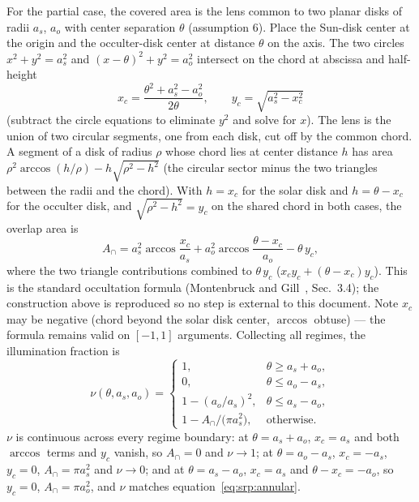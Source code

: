 For the partial case, the covered area is the lens common to two planar
disks of radii $a_{s}$, $a_{o}$ with center separation $\theta$
(assumption 6). Place the Sun-disk center at the origin and the
occulter-disk center at distance $\theta$ on the axis. The two circles
$x^{2} + y^{2} = a_{s}^{2}$ and $(x - \theta)^{2} + y^{2} = a_{o}^{2}$
intersect on the chord at abscissa and half-height
\begin{equation}
  x_{c} = \frac{\theta^{2} + a_{s}^{2} - a_{o}^{2}}{2\theta},
  \qquad
  y_{c} = \sqrt{a_{s}^{2} - x_{c}^{2}}
  \label{eq:srp:chord}
\end{equation}
(subtract the circle equations to eliminate $y^{2}$ and solve for $x$).
The lens is the union of two circular segments, one from each disk, cut
off by the common chord. A segment of a disk of radius $\rho$ whose
chord lies at center distance $h$ has area $\rho^{2} \arccos(h/\rho) -
h \sqrt{\rho^{2} - h^{2}}$ (the circular sector minus the two triangles
between the radii and the chord). With $h = x_{c}$ for the solar disk
and $h = \theta - x_{c}$ for the occulter disk, and
$\sqrt{\rho^{2} - h^{2}} = y_{c}$ on the shared chord in both cases, the
overlap area is
\begin{equation}
  A_{\cap} = a_{s}^{2} \arccos \frac{x_{c}}{a_{s}}
           + a_{o}^{2} \arccos \frac{\theta - x_{c}}{a_{o}}
           - \theta\, y_{c},
  \label{eq:srp:overlap}
\end{equation}
where the two triangle contributions combined to $\theta\, y_{c}$
($x_{c} y_{c} + (\theta - x_{c}) y_{c}$). This is the standard
occultation formula (Montenbruck and Gill~\cite{montenbruck2000},
Sec.~3.4); the construction above is reproduced so no step is external
to this document. Note $x_{c}$ may be negative (chord beyond the solar
disk center, $\arccos$ obtuse) --- the formula remains valid on
$[-1, 1]$ arguments. Collecting all regimes, the illumination fraction
is
\begin{equation}
  \boxed{\;
  \nu(\theta, a_{s}, a_{o}) =
  \begin{cases}
    1, & \theta \geq a_{s} + a_{o}, \\[2pt]
    0, & \theta \leq a_{o} - a_{s}, \\[2pt]
    1 - \left( a_{o} / a_{s} \right)^{2},
       & \theta \leq a_{s} - a_{o}, \\[2pt]
    1 - A_{\cap} / \bigl( \pi a_{s}^{2} \bigr), & \text{otherwise.}
  \end{cases}
  \;}
  \label{eq:srp:nu}
\end{equation}
$\nu$ is continuous across every regime boundary: at
$\theta = a_{s} + a_{o}$, $x_{c} = a_{s}$ and both $\arccos$ terms and
$y_{c}$ vanish, so $A_{\cap} = 0$ and $\nu \to 1$; at
$\theta = a_{o} - a_{s}$, $x_{c} = -a_{s}$, $y_{c} = 0$,
$A_{\cap} = \pi a_{s}^{2}$ and $\nu \to 0$; and at
$\theta = a_{s} - a_{o}$, $x_{c} = a_{s}$ and
$\theta - x_{c} = -a_{o}$, so $y_{c} = 0$,
$A_{\cap} = \pi a_{o}^{2}$, and $\nu$ matches
equation~\eqref{eq:srp:annular}.

